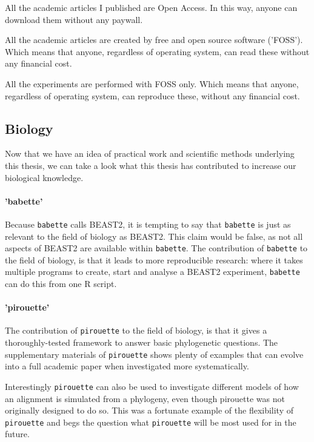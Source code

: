 All the academic articles I published are Open Access. 
In this way, anyone can download them without any paywall.

All the academic articles are created by free and open source software ('FOSS').
Which means that anyone, regardless of operating system, can
read these without any financial cost.

All the experiments are performed with FOSS only.
Which means that anyone, regardless of operating system, can
reproduce these, without any financial cost.

\subsection{Biology}

Now that we have an idea of practical work and scientific methods underlying
this thesis, we can take a look what this thesis has contributed to
increase our biological knowledge. 

\paragraph{'babette'}

Because \verb;babette; calls BEAST2, it is tempting to say that \verb;babette;
is just as relevant to the field of biology as BEAST2. 
This claim would be false, as not all aspects of BEAST2 are available
within \verb;babette;. The contribution of \verb;babette; to the field of biology, 
is that it leads to more reproducible research: where it takes multiple
programs to create, start and analyse a BEAST2 experiment, \verb;babette;
can do this from one R script. 

\paragraph{'pirouette'} 

The contribution of \verb;pirouette; to the field of biology, 
is that it gives a thoroughly-tested framework to answer
basic phylogenetic questions. The supplementary materials 
of \verb;pirouette; shows plenty of examples that can evolve into
a full academic paper when investigated more systematically.

Interestingly \verb;pirouette; can also be used to 
investigate different models of how an alignment is simulated
from a phylogeny, even though pirouette was not originally designed to do so. This was a fortunate example of the flexibility of 
\verb;pirouette; and begs the question what \verb;pirouette; will be most used for in the future.

